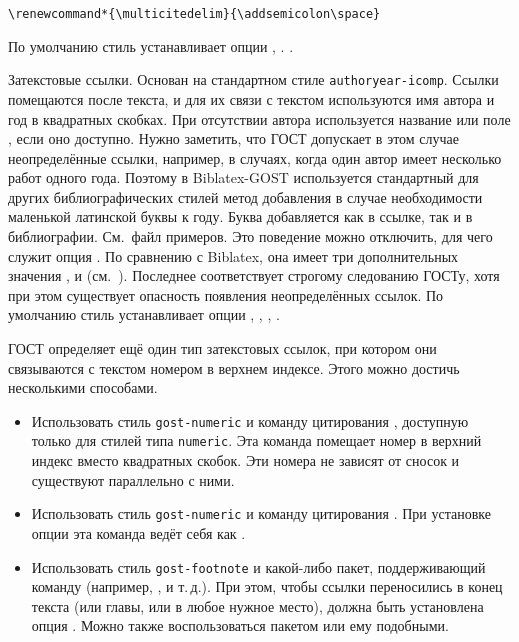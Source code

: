\documentclass[11pt,a4paper,headings=small,numbers=enddot]{ltxdockit}[2011/03/25]
\newcommand*{\biblatex}{Biblatex\xspace}
\newcommand*{\biblatexgost}{\biblatex-GOST\xspace}
\newcommand*{\bibsty}{\texttt}
\begin{document}
\begin{marglist}
\begin{lstlisting}[style=latex]
\renewcommand*{\multicitedelim}{\addsemicolon\space}
\end{lstlisting}

По умолчанию стиль устанавливает опции , .
.

\item[gost-authoryear]
Затекстовые ссылки. Основан на стандартном 
стиле \bibsty{authoryear-icomp}. Ссылки помещаются после текста, и для их связи 
с текстом используются имя автора и год в квадратных скобках. При отсутствии автора
используется название или поле , если оно доступно. Нужно заметить, что ГОСТ 
допускает в этом случае неопределённые ссылки, например, в случаях, когда один автор имеет несколько 
работ одного года. Поэтому в \biblatexgost используется стандартный для других библиографических 
стилей 
метод добавления в случае необходимости маленькой латинской буквы к году. Буква добавляется как в 
ссылке, так и в библиографии. См.~файл примеров. Это поведение можно отключить, для чего служит 
опция .
По сравнению с \biblatex, она имеет три дополнительных значения ,
 и 
 (см.~). Последнее соответствует строгому 
следованию ГОСТу, хотя при этом существует опасность появления неопределённых ссылок.
По умолчанию стиль устанавливает опции , 
,
,
. 

\end{marglist}

ГОСТ определяет ещё один тип затекстовых ссылок, при котором они 
связываются с текстом номером в верхнем индексе. Этого можно достичь несколькими способами. 

\begin{itemize}
\item Использовать стиль \bibsty{gost-numeric} и команду цитирования  
, доступную только для стилей типа \bibsty{numeric}. Эта команда
помещает номер в верхний индекс вместо квадратных скобок. Эти номера не зависят от 
сносок  и существуют параллельно с ними.
\item Использовать стиль \bibsty{gost-numeric} и команду цитирования
. При установке опции  эта команда ведёт себя 
как .
\item Использовать стиль \bibsty{gost-footnote} и какой-либо пакет, поддерживающий команду  (например, ,  и т.\,д.). 
При этом, чтобы ссылки переносились в конец текста (или главы, или в любое 
нужное место), должна быть установлена
опция . Можно также воспользоваться 
пакетом  или ему подобными.
\end{itemize}
\end{document}
